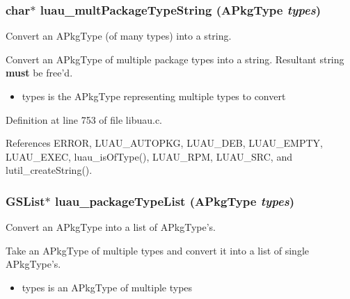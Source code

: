 \subsubsection{\setlength{\rightskip}{0pt plus 5cm}char$\ast$ luau\_\-mult\-Package\-Type\-String ({\bf APkg\-Type} {\em types})}\label{libuau_8h_a63}


Convert an APkg\-Type (of many types) into a string. 

Convert an APkg\-Type of multiple package types into a string. Resultant string {\bf must} be free'd.

\begin{itemize}
\item types is the APkg\-Type representing multiple types to convert 
\end{itemize}


Definition at line 753 of file libuau.c.

References ERROR, LUAU\_\-AUTOPKG, LUAU\_\-DEB, LUAU\_\-EMPTY, LUAU\_\-EXEC, luau\_\-is\-Of\-Type(), LUAU\_\-RPM, LUAU\_\-SRC, and lutil\_\-create\-String().
\subsubsection{\setlength{\rightskip}{0pt plus 5cm}GSList$\ast$ luau\_\-package\-Type\-List ({\bf APkg\-Type} {\em types})}\label{libuau_8h_a72}


Convert an APkg\-Type into a list of APkg\-Type's. 

Take an APkg\-Type of multiple types and convert it into a list of single APkg\-Type's.

\begin{itemize}
\item types is an APkg\-Type of multiple types 
\end{itemize}


